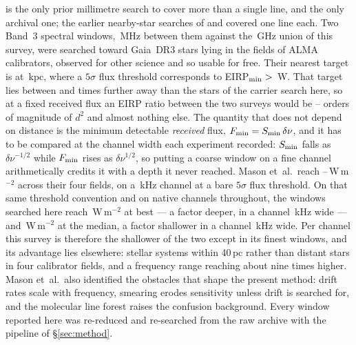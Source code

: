 \citet{Mason2025} is the only prior millimetre search to cover more than a
single line, and the only archival one; the earlier nearby-star searches of
\citet{Steffes1994} and \citet{Mauersberger1996} covered one line each. Two
Band~3 spectral windows, \MasonBandMHz\,MHz between them against the
\CvUnionA\,GHz union of this survey, were searched toward
\MasonNStar{} Gaia~DR3 stars lying in the fields of \MasonNCal{} ALMA
calibrators, observed for other science and so usable for free. Their
nearest target is at \MasonNearKpc\,kpc, where a $5\sigma$ flux threshold
corresponds to EIRP$_{\rm min}>{}$\MasonNearEirp\,W. That target lies
between \MasonDistRatioFar{} and \MasonDistRatioNear{} times further away
than the stars of the carrier search here, so at a fixed received flux an
EIRP ratio between the two surveys would be
\MasonEirpOrdLo--\MasonEirpOrdHi{} orders of magnitude of $d^{2}$ and
almost nothing else. The quantity
that does not depend on distance is the minimum detectable \emph{received}
flux, $F_{\rm min}=S_{\rm min}\,\delta\nu$, and it has to be compared at
the channel width each experiment recorded: $S_{\rm min}$ falls as
$\delta\nu^{-1/2}$ while $F_{\rm min}$ rises as $\delta\nu^{1/2}$, so
putting a coarse window on a fine channel arithmetically credits it with a
depth it never reached. Mason
et~al.\ reach \MasonFluxLo--\MasonFluxHi\,W\,m$^{-2}$ across their four
fields, on a \MasonChanKHz\,kHz channel at a bare $5\sigma$ flux
threshold. On that same threshold convention and on native channels
throughout, the windows searched here reach \FluxTrigBest\,W\,m$^{-2}$ at
best --- a factor \FluxNatBestRatio{} deeper, in a channel
\FluxChanBestKHz\,kHz wide --- and \FluxTrigMed\,W\,m$^{-2}$ at the
median, a factor \FluxNatMedRatio{} shallower in a channel
\FluxChanMedKHz\,kHz wide. Per channel this survey is therefore the
shallower of the two except in its finest windows, and its advantage lies
elsewhere: \NSysClassA{} stellar systems within 40\,pc rather than distant
stars in four calibrator fields, and a frequency range reaching about nine
times higher. Mason et~al.\ also
identified the obstacles that shape the present method: drift rates scale
with frequency, smearing erodes sensitivity unless drift is searched for,
and the molecular line forest raises the confusion background. Every
window reported here was re-reduced and re-searched from the raw archive
with the pipeline of \S\ref{sec:method}.

